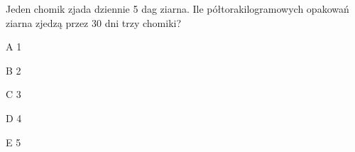 \begin{tresc}
Jeden chomik zjada dziennie 5 dag ziarna. Ile półtorakilogramowych opakowań ziarna zjedzą przez 30 dni trzy chomiki?
\end{tresc}
\begin{wariant}{A} 1 \end{wariant}
\begin{wariant}{B} 2 \end{wariant}
\begin{wariant}{C} 3 \end{wariant}
\begin{wariant}{D} 4 \end{wariant}
\begin{wariant}{E} 5 \end{wariant}
